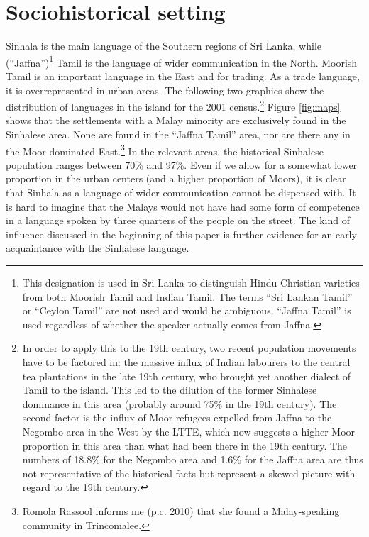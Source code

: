 \documentclass[a4paper,10pt]{article}
\begin{document}
\section{Sociohistorical setting}


Sinhala is the main language of the Southern regions of
Sri Lanka, while (``Jaffna'')\footnote{This designation
 is used in Sri Lanka to distinguish Hindu-Christian varieties from both Moorish Tamil and Indian Tamil. The terms ``Sri Lankan Tamil'' or ``Ceylon Tamil'' are not used and would be ambiguous. ``Jaffna Tamil'' is used regardless of whether the speaker actually comes from Jaffna.}
Tamil is the language of wider communication in the North. Moorish Tamil is an important language in the East and for trading. As a trade language, it is overrepresented in urban areas. The following two graphics show the distribution of languages in the island for the 2001 census.\footnote{In  
 order  to apply this to the 19th century, two recent population movements have to be factored in: the massive influx of Indian labourers to the central tea plantations in the late 19th century, who brought yet another dialect of Tamil to the island. This led to the dilution of the former Sinhalese dominance in this area (probably around 75\% in the 19th century). The second factor is the influx of Moor refugees expelled from Jaffna  to the Negombo area in the West by the LTTE, which now suggests a higher Moor proportion in this area than what had been there in the 19th century. The numbers of 18.8\% for the Negombo area and 1.6\% for the Jaffna area are thus not representative of the historical facts but represent a skewed picture with regard to the 19th century.
}
Figure \ref{fig:maps} shows that the settlements with a Malay minority are exclusively found in the Sinhalese area. None are found in the ``Jaffna Tamil'' area, nor are there any in the Moor-dominated East.\footnote{Romola 
 Rassool informs me (p.c. 2010) that she found a Malay-speaking community in Trincomalee.
} 
In the relevant areas, the historical Sinhalese population ranges between 70\% and 97\%. Even if we allow for a somewhat lower proportion in the urban centers (and a higher proportion of Moors), it is clear that Sinhala as a language of wider communication cannot be dispensed with. It is hard to imagine that the Malays would not have had some form of competence in a language spoken by three quarters of the people on the street. The kind of influence discussed in the beginning of this paper is further evidence for an early acquaintance with the Sinhalese language.
\end{document}
